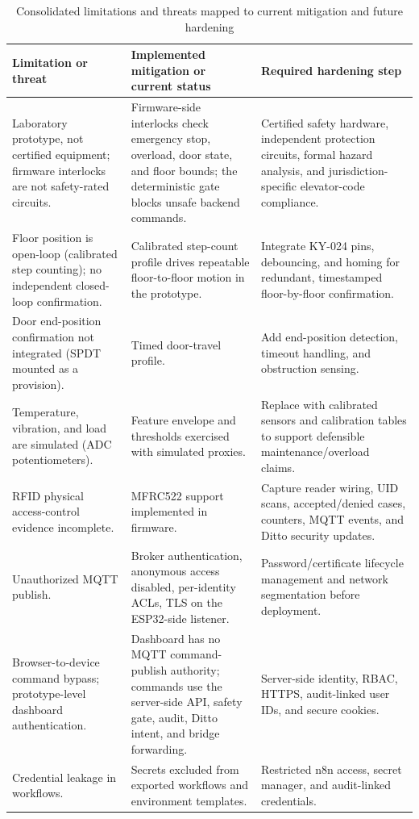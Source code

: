 \documentclass[journal]{IEEEtran}
\newcommand{\toprule}{\hline}
\newcommand{\midrule}{\hline}
\begin{document}
\begin{table}[t]
\caption{Consolidated limitations and threats mapped to current mitigation and future hardening}
\label{tab:limitations-hardening}
\centering
\footnotesize
\begin{tabularx}{\textwidth}{@{}p{}p{}Y@{}}
\toprule
Limitation or threat & Implemented mitigation or current status & Required hardening step \\
\midrule
Laboratory prototype, not certified equipment; firmware interlocks are not safety-rated circuits. & Firmware-side interlocks check emergency stop, overload, door state, and floor bounds; the deterministic gate blocks unsafe backend commands. & Certified safety hardware, independent protection circuits, formal hazard analysis, and jurisdiction-specific elevator-code compliance. \\
Floor position is open-loop (calibrated step counting); no independent closed-loop confirmation. & Calibrated step-count profile drives repeatable floor-to-floor motion in the prototype. & Integrate KY-024 pins, debouncing, and homing for redundant, timestamped floor-by-floor confirmation. \\
Door end-position confirmation not integrated (SPDT mounted as a provision). & Timed door-travel profile. & Add end-position detection, timeout handling, and obstruction sensing. \\
Temperature, vibration, and load are simulated (ADC potentiometers). & Feature envelope and thresholds exercised with simulated proxies. & Replace with calibrated sensors and calibration tables to support defensible maintenance/overload claims. \\
RFID physical access-control evidence incomplete. & MFRC522 support implemented in firmware. & Capture reader wiring, UID scans, accepted/denied cases, counters, MQTT events, and Ditto security updates. \\
Unauthorized MQTT publish. & Broker authentication, anonymous access disabled, per-identity ACLs, TLS on the ESP32-side listener. & Password/certificate lifecycle management and network segmentation before deployment. \\
Browser-to-device command bypass; prototype-level dashboard authentication. & Dashboard has no MQTT command-publish authority; commands use the server-side API, safety gate, audit, Ditto intent, and bridge forwarding. & Server-side identity, RBAC, HTTPS, audit-linked user IDs, and secure cookies. \\
Credential leakage in workflows. & Secrets excluded from exported workflows and environment templates. & Restricted n8n access, secret manager, and audit-linked credentials. \\

\end{tabularx}
\end{table}
\end{document}
